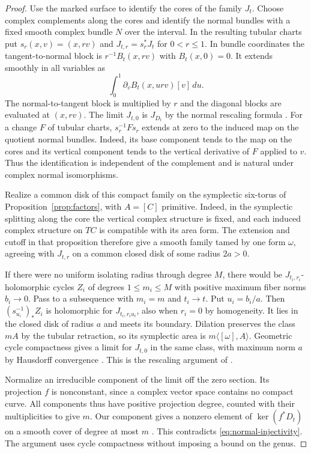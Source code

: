 \begin{proof}
Use the marked surface to identify the cores of the family $J_t$.
Choose complex complements along the cores and identify the normal
bundles with a fixed smooth complex bundle $N$ over the interval.
In the resulting tubular charts put $s_r(x,v)=(x,rv)$ and
$J_{t,r}=s_r^*J_t$ for $0<r\le1$. In bundle coordinates the
tangent-to-normal block is $r^{-1}B_t(x,rv)$ with $B_t(x,0)=0$.
It extends smoothly in all variables as
\[
  \int_0^1 \partial_v B_t(x,urv)[v]\,du .
\]
The normal-to-tangent block is multiplied by $r$ and the diagonal
blocks are evaluated at $(x,rv)$. The limit $J_{t,0}$ is $J_{D_t}$
by the normal rescaling formula \cite[Lemma~3.10]{dwcast}.
For a change $F$ of tubular charts, $s_r^{-1}Fs_r$ extends at zero
to the induced map on the quotient normal bundles. Indeed, its base
component tends to the map on the cores and its vertical component
tends to the vertical derivative of $F$ applied to $v$. Thus the
identification is independent of the complement and is natural under
complex normal isomorphisms.

Realize a common disk of this compact family on the symplectic
six-torus of Proposition~\ref{prop:factors}, with $A=[C]$ primitive.
Indeed, in the symplectic splitting along the core the vertical
complex structure is fixed, and each induced complex structure on
$TC$ is compatible with its area form. The extension and cutoff in
that proposition therefore give a smooth family tamed by one form
$\omega$, agreeing with $J_{t,r}$ on a common closed disk of some
radius $2a>0$.

If there were no uniform isolating radius through degree $M$, there
would be $J_{t_i,r_i}$-holomorphic cycles $Z_i$ of degrees
$1\le m_i\le M$ with positive maximum fiber norms $b_i\to0$.
Pass to a subsequence with $m_i=m$ and $t_i\to t$. Put $u_i=b_i/a$.
Then $(s_{u_i}^{-1})_*Z_i$ is holomorphic for $J_{t_i,r_i u_i}$,
also when $r_i=0$ by homogeneity. It lies in the closed disk of
radius $a$ and meets its boundary. Dilation preserves the class
$mA$ by the tubular retraction, so its symplectic area is
$m\langle[\omega],A\rangle$. Geometric cycle compactness gives a
limit for $J_{t,0}$ in the same class, with maximum norm $a$ by
Hausdorff convergence \cite[Theorem~2.11 and Remark~2.13]{diw}.
This is the rescaling argument of \cite[\S6]{dwcast}.

Normalize an irreducible component of the limit off the zero
section. Its projection $f$ is nonconstant, since a complex vector
space contains no compact curve. All components thus have positive
projection degree, counted with their multiplicities to give $m$.
Our component gives a nonzero element of $\ker(f^*D_t)$ on a
smooth cover of degree at most $m$ \cite[Proposition~3.12]{dwcast}.
This contradicts \eqref{eq:normal-injectivity}. The argument uses
cycle compactness without imposing a bound on the genus.


\end{proof}
